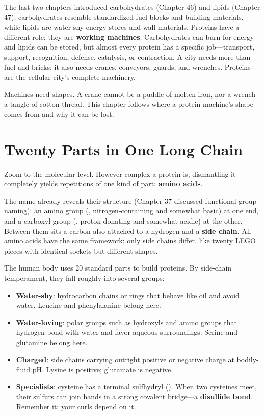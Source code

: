 The last two chapters introduced carbohydrates (Chapter 46) and lipids (Chapter 47): carbohydrates resemble standardized fuel blocks and building materials, while lipids are water-shy energy stores and wall materials. Proteins have a different role: they are \textbf{working machines}. Carbohydrates can burn for energy and lipids can be stored, but almost every protein has a specific job---transport, support, recognition, defense, catalysis, or contraction. A city needs more than fuel and bricks; it also needs cranes, conveyors, guards, and wrenches. Proteins are the cellular city's complete machinery.

Machines need shapes. A crane cannot be a puddle of molten iron, nor a wrench a tangle of cotton thread. This chapter follows where a protein machine's shape comes from and why it can be lost.

\section{Twenty Parts in One Long Chain}

Zoom to the molecular level. However complex a protein is, dismantling it completely yields repetitions of one kind of part: \textbf{amino acids}.

The name already reveals their structure (Chapter 37 discussed functional-group naming): an amino group (, nitrogen-containing and somewhat basic) at one end, and a carboxyl group (, proton-donating and somewhat acidic) at the other. Between them sits a carbon also attached to a hydrogen and a \textbf{side chain}. All amino acids have the same framework; only side chains differ, like twenty LEGO pieces with identical sockets but different shapes.

The human body uses 20 standard parts to build proteins. By side-chain temperament, they fall roughly into several groups:

\begin{itemize}[itemsep=2pt]
\item \textbf{Water-shy}: hydrocarbon chains or rings that behave like oil and avoid water. Leucine and phenylalanine belong here.
\item \textbf{Water-loving}: polar groups such as hydroxyls and amino groups that hydrogen-bond with water and favor aqueous surroundings. Serine and glutamine belong here.
\item \textbf{Charged}: side chains carrying outright positive or negative charge at bodily-fluid pH. Lysine is positive; glutamate is negative.
\item \textbf{Specialists}: cysteine has a terminal sulfhydryl (). When two cysteines meet, their sulfurs can join hands in a strong covalent bridge---a \textbf{disulfide bond}. Remember it: your curls depend on it.
\end{itemize}

